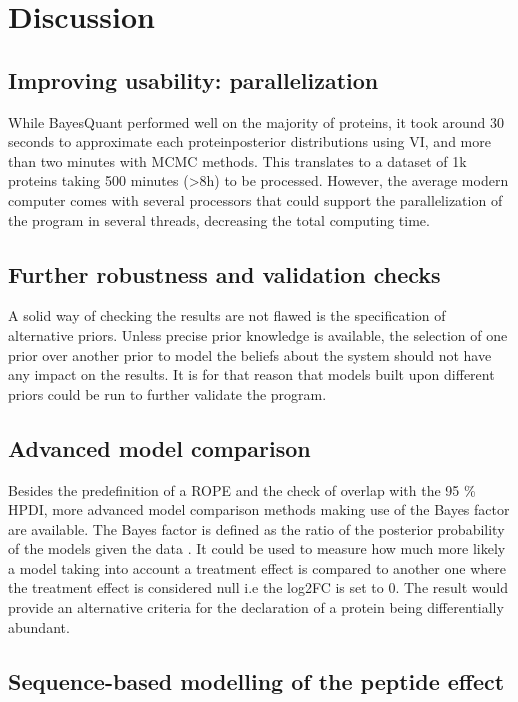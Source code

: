 \section{Discussion}

\subsection{Improving usability: parallelization}

While BayesQuant performed well on the majority of proteins, it took around 30 seconds to approximate each protein\textquotesingle posterior distributions using \ac{VI}, and more than two minutes with \ac{MCMC} methods. This translates to a dataset of 1k proteins taking 500 minutes (>8h) to be processed. However, the average modern computer comes with several processors that could support the parallelization of the program in several threads, decreasing the total computing time.

\subsection{Further robustness and validation checks}

A solid way of checking the results are not flawed is the specification of alternative priors. Unless precise prior knowledge is available, the selection of one prior over another prior to model the beliefs about the system should not have any impact on the results. It is for that reason that models built upon different priors could be run to further validate the program.


\subsection{Advanced model comparison}

Besides the predefinition of a \ac{ROPE} and the check of overlap with the 95 \% \ac{HPDI}, more advanced model comparison methods making use of the Bayes factor are available. The Bayes factor is defined as the ratio of the posterior probability of the models given the data \cite{Kruschke}. It could be used to measure how much more likely a model taking into account a treatment effect is compared to another one where the treatment effect is considered null i.e the \ac{log2FC} is set to 0. The result would provide an alternative criteria for the declaration of a protein being differentially abundant.

\subsection{Sequence-based modelling of the peptide effect}

